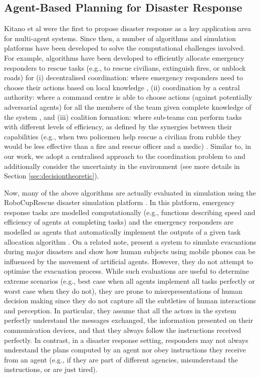 \subsection{Agent-Based Planning for Disaster Response}\label{sec:agentsdisasters}
Kitano et al \cite{kitano:2001} were the first to propose disaster response as a key application area for multi-agent systems. Since then, a number of algorithms and simulation platforms have been developed to solve the computational challenges involved. For example, algorithms  have been developed to efficiently allocate emergency responders to rescue tasks (e.g., to rescue civilians, extinguish fires, or unblock roads) for (i) decentralised coordination: where emergency responders need to choose their actions based on local knowledge \cite{Chapman2009,puyol:etal:2014}, (ii)  coordination by a central authority: where a command centre is able to choose actions (against potentially adversarial agents) for all the members of the team given complete knowledge of the system \cite{Khan-2011-JAAMAS,koes2006constraint,Scerri2005,tambe:etal:2011}, and (iii) coalition formation: where sub-teams can perform tasks with different levels of efficiency, as defined by the synergies between their capabilities (e.g., when two policemen help rescue a civilian from rubble they would be less effective than a fire and rescue officer and a medic) \cite{ramchurn:etal:2010}.   Similar to\cite{Khan-2011-JAAMAS,koes2006constraint,Scerri2005}, in our work, we  adopt a centralised approach to the coordination problem to  and additionally consider the uncertainty in the environment (see more details in Section \ref{sec:decisiontheoretic}).

Now, many of the above algorithms are actually evaluated in simulation using the  Robo\-Cup\-Rescue disaster simulation platform \cite{skinner:ramchurn:2010}. In this platform, emergency response tasks are modelled computationally (e.g., functions describing speed and efficiency of agents at completing tasks) and the emergency responders are modelled as agents that automatically implement the outputs of a given task allocation algorithm \cite{kleiner:etal:2013,ramchurn:etal:2010}. On a related note, \cite{nakajima:etal:2007} present a system to simulate evacuations during major disasters and show how human subjects using mobile phones can be influenced by the movement of artificial agents. However, they do not attempt to optimise the evacuation process.  While such evaluations are useful to determine extreme scenarios (e.g., best case when all agents implement all tasks perfectly or worst case when they do not), they are prone to misrepresentations of human decision making since they do not capture all the subtleties of human interactions and perception. In particular, they assume that all the actors in the system perfectly understand the messages exchanged, the information presented on their communication devices, and that they always follow the instructions received perfectly. In contrast, in a disaster response setting, responders may not  always understand the plans computed by an agent nor obey instructions they receive from an agent (e.g., if they are part of different agencies, misunderstand the instructions, or are just tired).  

